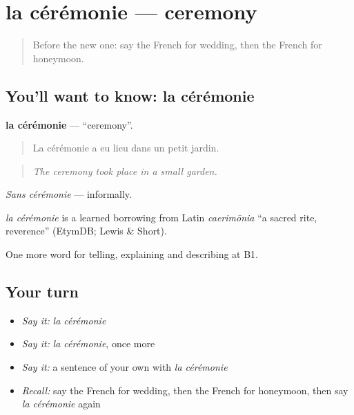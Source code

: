 \section[la cérémonie]{la cérémonie — ceremony}

\label{lesson:FR-C489-ceremonie}



\begin{quote}
Before the new one: say the French for wedding, then the French for honeymoon.
\end{quote}

\subsection*{You'll want to know: la cérémonie}
\textbf{la cérémonie} — \textquotedblleft{}ceremony\textquotedblright{}.

\begin{quote}
La cérémonie a eu lieu dans un petit jardin.
\end{quote}

\begin{quote}
\emph{The ceremony took place in a small garden.}
\end{quote}

\emph{Sans cérémonie} — informally.

\begin{cousinweb}
\emph{la cérémonie} is a learned borrowing from Latin \emph{caerimōnia} \textquotedblleft{}a sacred rite, reverence\textquotedblright{} (EtymDB; Lewis \& Short).
\end{cousinweb}

\begin{grammarlens}[title={What you've built}]
One more word for telling, explaining and describing at B1.
\end{grammarlens}

\subsection*{Your turn}
\begin{itemize}
\raggedright
  \item \emph{Say it:} \emph{la cérémonie}
  \item \emph{Say it:} \emph{la cérémonie}, once more
  \item \emph{Say it:} a sentence of your own with \emph{la cérémonie}
  \item \emph{Recall:} say the French for wedding, then the French for honeymoon, then say \emph{la cérémonie} again
\end{itemize}

